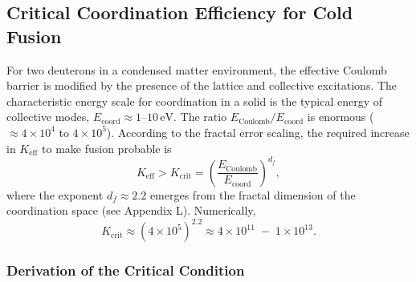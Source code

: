\documentclass[12pt]{article}
\theoremstyle{remark}
\newcommand{\Keff}{K_{\mathrm{eff}}}
\newcommand{\df}{d_{\!f}}
\newcommand{\Kcrit}{K_{\mathrm{crit}}}
\begin{document}
	\subsection{Critical Coordination Efficiency for Cold Fusion}
	
	For two deuterons in a condensed matter environment, the effective Coulomb barrier is modified by the presence of the lattice and collective excitations. The characteristic energy scale for coordination in a solid is the typical energy of collective modes, \(E_{\mathrm{coord}} \approx 1\)–\(10\,\text{eV}\). The ratio \(E_{\text{Coulomb}}/E_{\mathrm{coord}}\) is enormous (\(\approx 4\times10^4\) to \(4\times10^5\)). According to the fractal error scaling, the required increase in \(\Keff\) to make fusion probable is
	\begin{equation}
		\Keff > \Kcrit = \left( \frac{E_{\text{Coulomb}}}{E_{\mathrm{coord}}} \right)^{\df},
		\label{eq:Kcrit}
	\end{equation}
	where the exponent \(\df \approx 2.2\) emerges from the fractal dimension of the coordination space (see Appendix L). Numerically,
	\[
	\Kcrit \approx (4\times10^5)^{2.2} \approx 4\times10^{11} \;-\; 1\times10^{13}.
	\]
	
	\subsubsection{Derivation of the Critical Condition}
	
\end{document}
